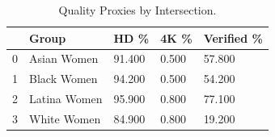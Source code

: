 \begin{table}[htbp]
\centering
\caption{Quality Proxies by Intersection.}
\label{tab:eda_quality_proxies_by_group}
\begin{tabular}{lllll}
\toprule
 & Group & HD \% & 4K \% & Verified \% \\
\midrule
0 & Asian Women & 91.400 & 0.500 & 57.800 \\
1 & Black Women & 94.200 & 0.500 & 54.200 \\
2 & Latina Women & 95.900 & 0.800 & 77.100 \\
3 & White Women & 84.900 & 0.800 & 19.200 \\
\bottomrule
\end{tabular}

\end{table}